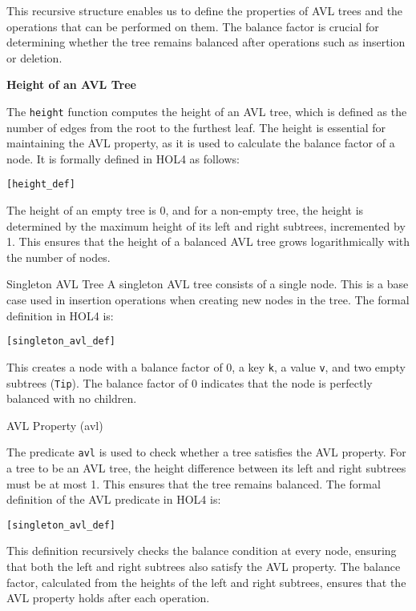 This recursive structure enables us to define the properties of AVL trees and the operations that can be performed on them. The balance factor is crucial for determining whether the tree remains balanced after operations such as insertion or deletion.

\textbf{Height of an AVL Tree}

The \texttt{height} function computes the height of an AVL tree, which is defined as the number of edges from the root to the furthest leaf. The height is essential for maintaining the AVL property, as it is used to calculate the balance factor of a node. It is formally defined in HOL4 as follows:

\begin{alltt}
	[height_def]
\end{alltt}


The height of an empty tree is 0, and for a non-empty tree, the height is determined by the maximum height of its left and right subtrees, incremented by 1. This ensures that the height of a balanced AVL tree grows logarithmically with the number of nodes.


\begin{defn}{Singleton AVL Tree}
A singleton AVL tree consists of a single node. This is a base case used in insertion operations when creating new nodes in the tree. The formal definition in HOL4 is:

\begin{alltt}
	[singleton_avl_def]
\end{alltt}



This creates a node with a balance factor of 0, a key \texttt{k}, a value \texttt{v}, and two empty subtrees (\texttt{Tip}). The balance factor of 0 indicates that the node is perfectly balanced with no children.
\end{defn}


\begin{defn}{AVL Property (avl)}

The predicate \texttt{avl} is used to check whether a tree satisfies the AVL property. For a tree to be an AVL tree, the height difference between its left and right subtrees must be at most 1. This ensures that the tree remains balanced. The formal definition of the AVL predicate in HOL4 is:

\begin{alltt}
	[singleton_avl_def]
\end{alltt}

This definition recursively checks the balance condition at every node, ensuring that both the left and right subtrees also satisfy the AVL property. The balance factor, calculated from the heights of the left and right subtrees, ensures that the AVL property holds after each operation.
\end{defn}


